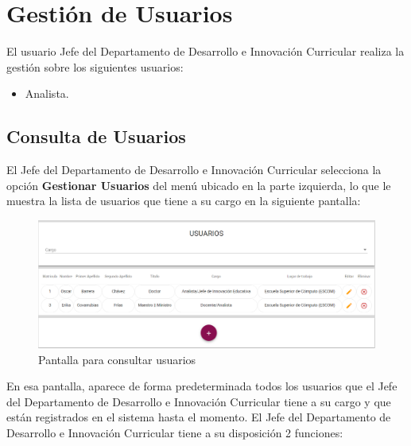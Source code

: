 \clearpage
\section{Gestión de Usuarios}	

El usuario  Jefe del Departamento de Desarrollo e Innovación Curricular realiza la gestión sobre los siguientes usuarios:
\begin{itemize}
		\item Analista.
\end{itemize}
\subsection{Consulta de Usuarios}

El Jefe del Departamento de Desarrollo e Innovación Curricular selecciona  la opción \textbf{Gestionar Usuarios} del menú ubicado en la parte izquierda, lo que le muestra la lista de usuarios que tiene a su cargo en la siguiente pantalla:

\begin{figure}[H]
	\centering
	\hypertarget{consultarUs-JDDIC}{\includegraphics[width=0.6\linewidth]{images/SP5/Consultar-Usuario}}
	\caption{Pantalla para consultar usuarios}
	\label{consultarrh-JDDIC}
\end{figure}

En esa pantalla, aparece de forma predeterminada todos los usuarios que el Jefe del Departamento de Desarrollo e Innovación Curricular tiene a su cargo y que están registrados en el sistema hasta el momento. El Jefe del Departamento de Desarrollo e Innovación Curricular tiene a su disposición 2 funciones:


